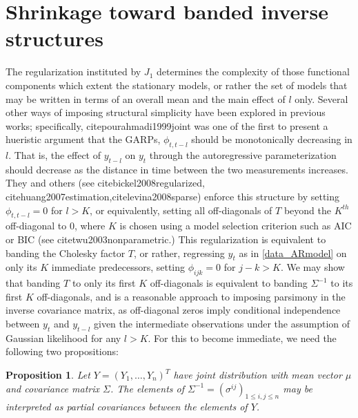 \documentclass[12pt]{article}
\newtheorem{proposition}[theorem]{Proposition}
\theoremstyle{definition}
\begin{document}
\section{Shrinkage toward banded inverse structures}


The regularization instituted by $J_1$ determines the  complexity of those functional components which extent the stationary models, or rather the set of models that may be written in terms of an overall mean and the main effect of $l$ only. Several other ways of imposing structural simplicity have been explored in previous works; specifically, cite{pourahmadi1999joint} was one of the first to present a hueristic argument that the GARPs, $\phi_{t,t-l}$ should be monotonically decreasing in $l$. That is, the effect of $y_{t-l}$ on $y_t$ through the autoregressive parameterization should decrease as the distance in time between the two measurements increases. They and others (see cite{bickel2008regularized}, cite{huang2007estimation},cite{levina2008sparse}) enforce this structure by setting $\phi_{t,t-l}=0$ for $l > K$, or equivalently, setting all off-diagonals of $T$ beyond the $K^{th}$ off-diagonal to $0$, where $K$ is chosen using a model selection criterion such as AIC or BIC (see  citet{wu2003nonparametric}.) This regularization is equivalent to banding the Cholesky factor $T$, or rather, regressing $y_t$ as in \eqref{data_ARmodel} on only its $K$ immediate predecessors, setting $\phi_{ijk} = 0$ for $j-k>K$. We may show that banding $T$ to only its first $K$ off-diagonals is equivalent to banding $\Sigma^{-1}$ to its first $K$ off-diagonals, and is a reasonable approach to imposing parsimony in the inverse covariance matrix, as off-diagonal zeros imply conditional independence between $y_t$ and $y_{t-l}$ given the intermediate observations under the assumption of Gaussian likelihood for any $l > K$. For this to become immediate, we need the following two propositions:

\begin{proposition}
Let $Y = \left(Y_1, \dots, Y_n\right)^T$ have joint distribution with mean vector $\mu$ and covariance matrix $\Sigma$. The elements of $\Sigma^{-1} = \left( \sigma^{ij} \right)_{1 \le i,j \le n}$ may be interpreted as partial covariances between the elements of $Y$.
\end{proposition}
\end{document}
